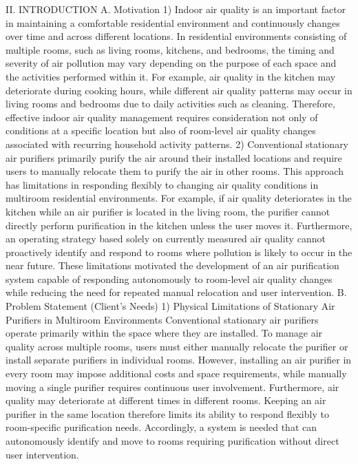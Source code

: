 II.	INTRODUCTION 
A.	 Motivation
1) Indoor air quality is an important factor in maintaining a comfortable residential environment and continuously changes over time and across different locations. In residential environments consisting of multiple rooms, such as living rooms, kitchens, and bedrooms, the timing and severity of air pollution may vary depending on the purpose of each space and the activities performed within it. For example, air quality in the kitchen may deteriorate during cooking hours, while different air quality patterns may occur in living rooms and bedrooms due to daily activities such as cleaning. Therefore, effective indoor air quality management requires consideration not only of conditions at a specific location but also of room-level air quality changes associated with recurring household activity patterns.
2) Conventional stationary air purifiers primarily purify the air around their installed locations and require users to manually relocate them to purify the air in other rooms. This approach has limitations in responding flexibly to changing air quality conditions in multiroom residential environments. For example, if air quality deteriorates in the kitchen while an air purifier is located in the living room, the purifier cannot directly perform purification in the kitchen unless the user moves it. Furthermore, an operating strategy based solely on currently measured air quality cannot proactively identify and respond to rooms where pollution is likely to occur in the near future. These limitations motivated the development of an air purification system capable of responding autonomously to room-level air quality changes while reducing the need for repeated manual relocation and user intervention.
B.	Problem Statement (Client's Needs)
1) Physical Limitations of Stationary Air Purifiers in Multiroom Environments
Conventional stationary air purifiers operate primarily within the space where they are installed. To manage air quality across multiple rooms, users must either manually relocate the purifier or install separate purifiers in individual rooms. However, installing an air purifier in every room may impose additional costs and space requirements, while manually moving a single purifier requires continuous user involvement.
Furthermore, air quality may deteriorate at different times in different rooms. Keeping an air purifier in the same location therefore limits its ability to respond flexibly to room-specific purification needs. Accordingly, a system is needed that can autonomously identify and move to rooms requiring purification without direct user intervention.

